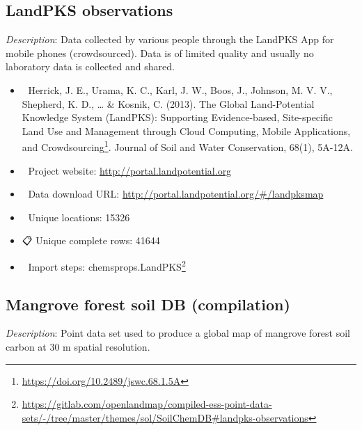 \documentclass[
  graybox,natbib,nospthms]{svmono}
\providecommand{\tightlist}{%
  \setlength{\itemsep}{0pt}\setlength{\parskip}{0pt}}
\providecommand{\tightlist}{\setlength{\itemsep}{0pt}\setlength{\parskip}{0pt}}
\renewcommand{\href}[2]{#2 (\url{#1})}
\renewcommand{\href}[2]{#2\footnote{\url{#1}}}
\begin{document}
\hypertarget{landpks-observations}{%
\subsection{LandPKS observations}\label{landpks-observations}}

\emph{Description}: Data collected by various people through the LandPKS App for mobile
phones (crowdsourced). Data is of limited quality and usually no laboratory data is collected and shared.

\begin{itemize}
\tightlist
\item
  📕 Herrick, J. E., Urama, K. C., Karl, J. W., Boos, J., Johnson, M. V. V., Shepherd, K. D., \ldots{} \& Kosnik, C. (2013). \href{https://doi.org/10.2489/jswc.68.1.5A}{The Global Land-Potential Knowledge System (LandPKS): Supporting Evidence-based, Site-specific Land Use and Management through Cloud Computing, Mobile Applications, and Crowdsourcing}. Journal of Soil and Water Conservation, 68(1), 5A-12A.\\
\item
  🔗 Project website: \url{http://portal.landpotential.org}\\
\item
  📂 Data download URL: \url{http://portal.landpotential.org/\#/landpksmap}\\
\item
  📍 Unique locations: 15326\\
\item
  📋 Unique complete rows: 41644\\
\item
  📝 Import steps: \href{https://gitlab.com/openlandmap/compiled-ess-point-data-sets/-/tree/master/themes/sol/SoilChemDB\#landpks-observations}{chemsprops.LandPKS}
\end{itemize}

\hypertarget{mangrove-forest-soil-db-compilation}{%
\subsection{Mangrove forest soil DB (compilation)}\label{mangrove-forest-soil-db-compilation}}

\emph{Description}: Point data set used to produce a global map of mangrove forest
soil carbon at 30 m spatial resolution.
\end{document}
